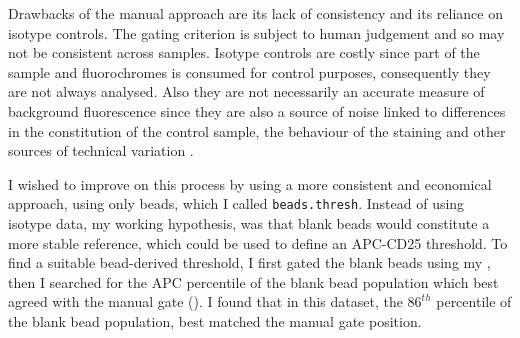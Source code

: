Drawbacks of the manual approach are its lack of consistency and its reliance on isotype controls.
The gating criterion is subject to human judgement and so may not be consistent across samples.
Isotype controls are costly since part of the sample and fluorochromes is consumed for control purposes, consequently they are not always analysed.
Also they are not necessarily an accurate measure of background fluorescence since
they are also a source of noise linked to differences in the constitution of the control sample,
the behaviour of the staining and other sources of technical variation \citep{OGorman:1999vd,Maecker:2006ft}.

I wished to improve on this process by using a more consistent and economical approach, using only beads, which I called \texttt{beads.thresh}.
Instead of using isotype data, my working hypothesis,
was that blank beads would constitute a more stable reference, which could be used to define an APC-CD25 threshold.
To find a suitable bead-derived threshold, I first gated the blank beads using my , then I searched for the APC percentile of the
blank bead population which best agreed with the manual gate ().
I found that in this dataset, the $86^{th}$ percentile of the blank bead population, best matched the manual gate position.

